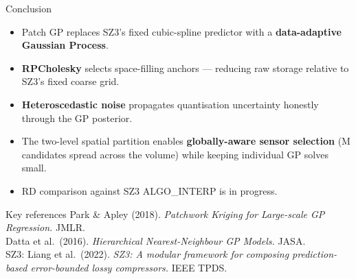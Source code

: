 \documentclass[10pt]{beamer}
\begin{document}
\begin{frame}{Conclusion}
  \begin{itemize}
    \item Patch GP replaces SZ3's fixed cubic-spline predictor with a
          \textbf{data-adaptive Gaussian Process}.
    \item \textbf{RPCholesky} selects space-filling anchors — reducing raw
          storage relative to SZ3's fixed coarse grid.
    \item \textbf{Heteroscedastic noise} propagates quantisation uncertainty
          honestly through the GP posterior.
    \item The two-level spatial partition enables \textbf{globally-aware
          sensor selection} (M candidates spread across the volume)
          while keeping individual GP solves small.
    \item RD comparison against SZ3 ALGO\_INTERP is in progress.
  \end{itemize}
  \vspace{8pt}
  \begin{block}{Key references}
    \small
    Park \& Apley (2018). \textit{Patchwork Kriging for Large-scale GP Regression.} JMLR.\\
    Datta et al.\ (2016). \textit{Hierarchical Nearest-Neighbour GP Models.} JASA.\\
    SZ3: Liang et al.\ (2022). \textit{SZ3: A modular framework for composing prediction-based error-bounded lossy compressors.} IEEE TPDS.
  \end{block}
\end{frame}
\end{document}
